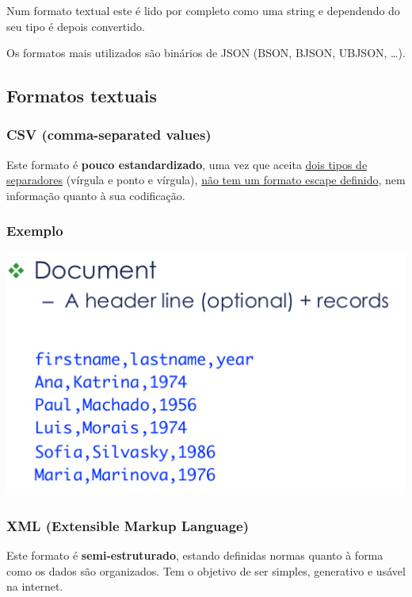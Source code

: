 \documentclass{article}
\begin{document}
Num formato textual este é lido por completo como uma
string e dependendo do seu tipo é depois convertido.

Os formatos mais utilizados são binários de JSON (BSON, BJSON, UBJSON, …).

\subsection{Formatos textuais}

\subsubsection{CSV (comma-separated values)}

Este formato é \textbf{pouco estandardizado}, uma vez que aceita \uline{dois tipos de separadores} (vírgula e
ponto e vírgula), \uline{não tem um formato
escape definido}, nem informação quanto à sua
codificação.

\subsubsection*{Exemplo}

\begin{center}
  \includegraphics[scale=0.3]{54}
\end{center}

\pagebreak

\subsubsection{XML (Extensible Markup Language)}

Este formato é \textbf{semi-estruturado}, estando definidas normas quanto à forma como os dados são
organizados. Tem o objetivo de ser simples, generativo e usável na internet.
\end{document}
